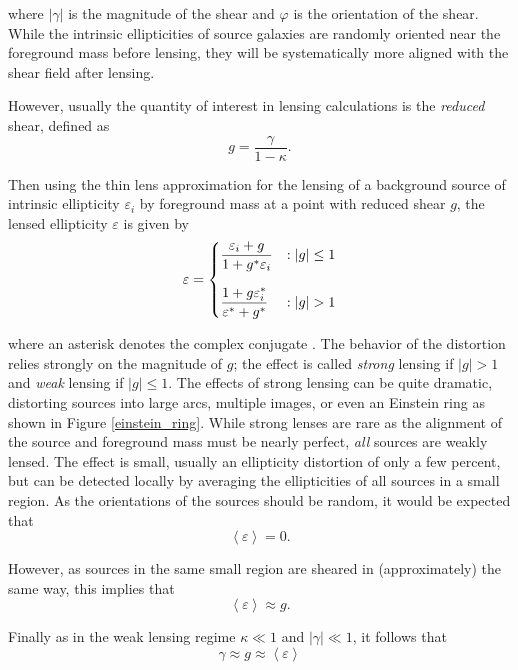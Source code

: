 \documentclass[%
 reprint,
 amsmath,amssymb,
 aps,nofootinbib
]{revtex4-1}
\begin{document}
\noindent where $|\gamma|$ is the magnitude of the shear and $\varphi$ is the orientation of the shear. While the intrinsic ellipticities of source galaxies are randomly oriented near the foreground mass before lensing, they will be systematically more aligned with the shear field after lensing.%

However, usually the quantity of interest in lensing calculations is the \textit{reduced} shear, defined as
\begin{equation}\label{reduced_shear}
g=\frac{\gamma}{1-\kappa}.
\end{equation}

\noindent Then using the thin lens approximation for the lensing of a background source of intrinsic ellipticity $\varepsilon_i$ by foreground mass at a point with reduced shear $g$, the lensed ellipticity $\varepsilon$ is given by
\begin{equation}\label{lensing}
 \varepsilon = \begin{dcases} 
      \frac{\varepsilon_i+g}{1+g^*\varepsilon_i} & : |g|\leq1 \\[0.75em]
       \frac{1+g\varepsilon_i^*}{\varepsilon^*+g^*} & : |g|>1
   \end{dcases}
\end{equation}

\noindent where an asterisk denotes the complex conjugate \cite{schneider}. The behavior of the distortion relies strongly on the magnitude of $g$; the
effect is called \textit{strong} lensing if $|g|>1$ and \textit{weak} lensing if $|g|\leq1$. The effects of strong lensing can be quite dramatic, distorting sources into large arcs, multiple images, or even an Einstein ring as shown in Figure \ref{einstein_ring}. While strong lenses are rare as the alignment of the source and foreground mass must be nearly perfect, \textit{all} sources are weakly lensed. The effect is small, usually an ellipticity distortion of only a few percent, but can be detected locally by averaging the ellipticities of all sources in a small region. As the orientations of the sources should be random, it would be expected that
$$\left<\varepsilon\right>=0.$$

\noindent However, as sources in the same small region are sheared in (approximately) the same way, this implies that
\begin{equation}
\left<\varepsilon\right>\approx g.
\end{equation}

 \noindent Finally as in the weak lensing regime ${\kappa\ll1}$ and ${|\gamma|\ll1}$, it follows that
 \begin{equation}
 \gamma\approx g\approx\left<\varepsilon\right>
 \end{equation}
\end{document}
